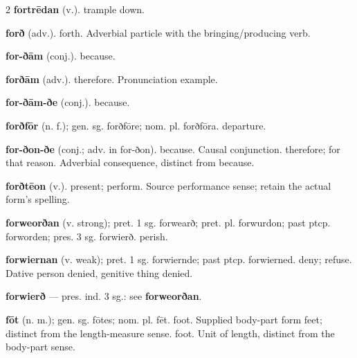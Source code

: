 \begin{multicols*}{2}
\textbf{fortrēdan} (v.). trample down.\par
\textbf{forð} (adv.). forth. Adverbial particle with the bringing/producing verb.\par
\textbf{for-ðām} (conj.). because.\par
\textbf{forðām} (adv.). therefore. Pronunciation example.\par
\textbf{for-ðām-ðe} (conj.). because.\par
\textbf{forðfōr} (n. f.); gen. sg. forðfōre; nom. pl. forðfōra. departure.\par
\textbf{for-ðon-ðe} (conj.; adv. in for-ðon). because. Causal conjunction. therefore; for that reason. Adverbial consequence, distinct from because.\par
\textbf{forðtēon} (v.). present; perform. Source performance sense; retain the actual form's spelling.\par
\textbf{forweorðan} (v. strong); pret. 1 sg. forwearð; pret. pl. forwurdon; past ptcp. forworden; pres. 3 sg. forwierð. perish.\par
\textbf{forwiernan} (v. weak); pret. 1 sg. forwiernde; past ptcp. forwierned. deny; refuse. Dative person denied, genitive thing denied.\par
\textbf{forwierð} — pres. ind. 3 sg.: see \textbf{forweorðan}.\par
\textbf{fōt} (n. m.); gen. sg. fōtes; nom. pl. fēt. foot. Supplied body-part form feet; distinct from the length-measure sense. foot. Unit of length, distinct from the body-part sense.\par

\end{multicols*}
